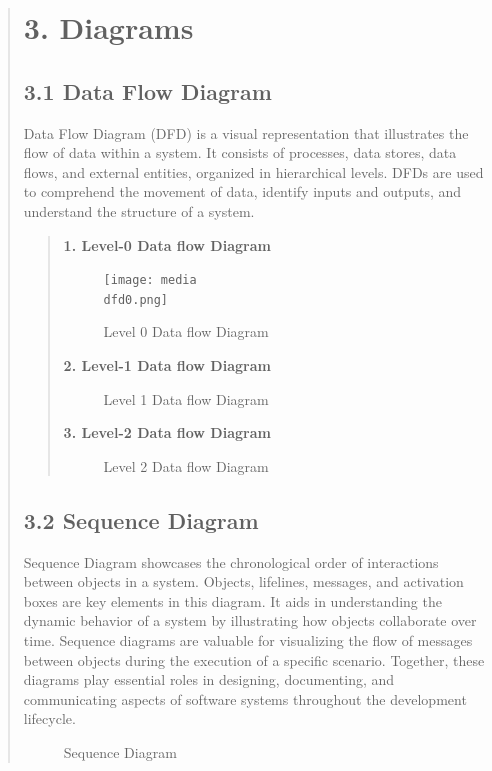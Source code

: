 \documentclass[12pt]{report}
\begin{document}
	
	\begin{quote}
		\section{3. Diagrams}
		
		\subsection{3.1 Data Flow Diagram}
		\hspace{1cm}Data Flow Diagram (DFD) is a visual representation that illustrates the flow of data within a system. It consists of processes, data stores, data flows, and external entities, organized in hierarchical levels. DFDs are used to comprehend the movement of data, identify inputs and outputs, and understand the structure of a system.\\
		
		\begin{quote}
			
			\textbf{1. Level-0 Data flow Diagram}
			\begin{figure}
				\centering
			    \texttt{[image: media\\dfd0.png]}
				\caption{Level 0 Data flow Diagram}
			\end{figure}
			
			
			\textbf{2. Level-1 Data flow Diagram}
			\begin{figure}
				\centering
				\caption{Level 1 Data flow Diagram}
			\end{figure}
			\clearpage
			\textbf{3. Level-2 Data flow Diagram}
			\begin{figure}
				\centering
				\caption{Level 2 Data flow Diagram}
			\end{figure}
		\end{quote}
		\subsection{3.2 Sequence Diagram}
		\hspace{1cm}Sequence Diagram showcases the chronological order of interactions between objects in a system. Objects, lifelines, messages, and activation boxes are key elements in this diagram. It aids in understanding the dynamic behavior of a system by illustrating how objects collaborate over time. Sequence diagrams are valuable for visualizing the flow of messages between objects during the execution of a specific scenario. Together, these diagrams play essential roles in designing, documenting, and communicating aspects of software systems throughout the development lifecycle.
		\begin{figure}
			\centering
			\caption{Sequence Diagram}
		\end{figure}

\end{quote}
\end{document}
